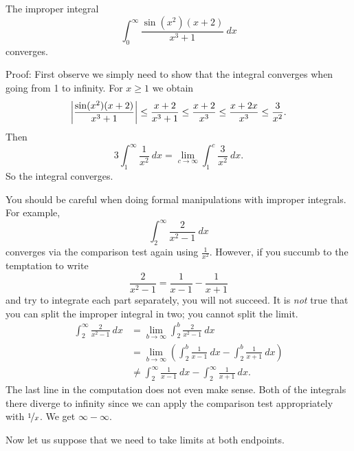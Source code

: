 \begin{example}
The improper integral
\begin{equation*}
\int_0^\infty \frac{\sin(x^2)(x+2)}{x^3+1} ~dx
\end{equation*}
converges.

Proof:  First observe we simply need to show
that the integral converges when going from 1 to infinity.
For $x \geq 1$ we obtain
\begin{equation*}
\left\lvert {\frac{\sin(x^2)(x+2)}{x^3+1}} \right\rvert
\leq
\frac{x+2}{x^3+1}
\leq \frac{x+2}{x^3} \leq
\frac{x+2x}{x^3} \leq \frac{3}{x^2} .
\end{equation*}
Then
\begin{equation*}
3 \int_1^\infty \frac{1}{x^2}~dx
=
\lim_{c\to\infty} \int_1^c \frac{3}{x^2} ~dx.
\end{equation*}
So the integral converges.
\end{example}

\begin{example}
You should be careful when doing formal manipulations with improper
integrals.
For example,
\begin{equation*}
\int_2^\infty \frac{2}{x^2-1}~dx
\end{equation*}
converges via the comparison test again using $\frac{1}{x^2}$.  However, if you
succumb to the temptation to write
\begin{equation*}
\frac{2}{x^2-1} = 
\frac{1}{x-1}
-
\frac{1}{x+1} 
\end{equation*}
and try to integrate each part separately, you will not succeed.
It is \emph{not} true that you can split the improper
integral in two; you cannot split the limit.
\begin{equation*}
\begin{split}
\int_2^\infty \frac{2}{x^2-1} ~dx &=
\lim_{b\to \infty} \int_2^b \frac{2}{x^2-1} ~dx
\\
&=
\lim_{b\to \infty}
\left(
\int_2^b \frac{1}{x-1}~dx
-
\int_2^b \frac{1}{x+1}~dx
\right)
\\
&\not=
\int_2^\infty \frac{1}{x-1}~dx
-
\int_2^\infty \frac{1}{x+1}~dx .
\end{split}
\end{equation*}
The last line in the computation does not even make sense.  Both of the
integrals there diverge to infinity since we can
apply the comparison test appropriately with
$\nicefrac{1}{x}$.  We get $\infty - \infty$.
\end{example}

Now let us suppose that we need to take limits at both endpoints.

